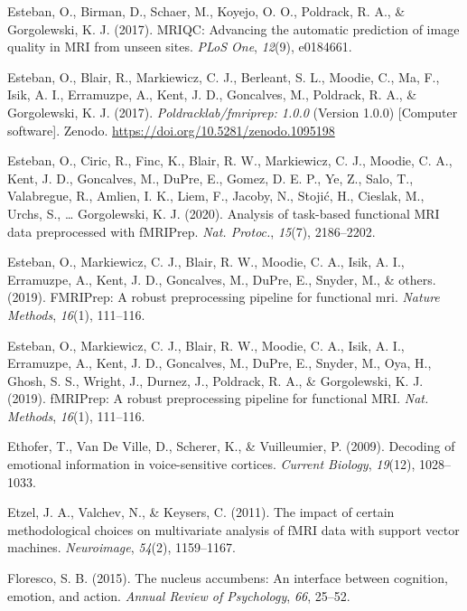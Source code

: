 \documentclass[11pt,american,a4paper,oneside,]{memoir} %
\begin{document}
\leavevmode\hypertarget{ref-Esteban2017-mv}{}%
Esteban, O., Birman, D., Schaer, M., Koyejo, O. O., Poldrack, R. A., \& Gorgolewski, K. J. (2017). MRIQC: Advancing the automatic prediction of image quality in MRI from unseen sites. \emph{PLoS One}, \emph{12}(9), e0184661.

\leavevmode\hypertarget{ref-esteban_oscar_2017_1095198}{}%
Esteban, O., Blair, R., Markiewicz, C. J., Berleant, S. L., Moodie, C., Ma, F., Isik, A. I., Erramuzpe, A., Kent, J. D., Goncalves, M., Poldrack, R. A., \& Gorgolewski, K. J. (2017). \emph{Poldracklab/fmriprep: 1.0.0} (Version 1.0.0) {[}Computer software{]}. Zenodo. \url{https://doi.org/10.5281/zenodo.1095198}

\leavevmode\hypertarget{ref-Esteban2020-qw}{}%
Esteban, O., Ciric, R., Finc, K., Blair, R. W., Markiewicz, C. J., Moodie, C. A., Kent, J. D., Goncalves, M., DuPre, E., Gomez, D. E. P., Ye, Z., Salo, T., Valabregue, R., Amlien, I. K., Liem, F., Jacoby, N., Stojić, H., Cieslak, M., Urchs, S., \ldots{} Gorgolewski, K. J. (2020). Analysis of task-based functional MRI data preprocessed with fMRIPrep. \emph{Nat. Protoc.}, \emph{15}(7), 2186--2202.

\leavevmode\hypertarget{ref-esteban2019fmriprep}{}%
Esteban, O., Markiewicz, C. J., Blair, R. W., Moodie, C. A., Isik, A. I., Erramuzpe, A., Kent, J. D., Goncalves, M., DuPre, E., Snyder, M., \& others. (2019). FMRIPrep: A robust preprocessing pipeline for functional mri. \emph{Nature Methods}, \emph{16}(1), 111--116.

\leavevmode\hypertarget{ref-Esteban2019-ri}{}%
Esteban, O., Markiewicz, C. J., Blair, R. W., Moodie, C. A., Isik, A. I., Erramuzpe, A., Kent, J. D., Goncalves, M., DuPre, E., Snyder, M., Oya, H., Ghosh, S. S., Wright, J., Durnez, J., Poldrack, R. A., \& Gorgolewski, K. J. (2019). fMRIPrep: A robust preprocessing pipeline for functional MRI. \emph{Nat. Methods}, \emph{16}(1), 111--116.

\leavevmode\hypertarget{ref-ethofer2009decoding}{}%
Ethofer, T., Van De Ville, D., Scherer, K., \& Vuilleumier, P. (2009). Decoding of emotional information in voice-sensitive cortices. \emph{Current Biology}, \emph{19}(12), 1028--1033.

\leavevmode\hypertarget{ref-etzel2011impact}{}%
Etzel, J. A., Valchev, N., \& Keysers, C. (2011). The impact of certain methodological choices on multivariate analysis of fMRI data with support vector machines. \emph{Neuroimage}, \emph{54}(2), 1159--1167.

\leavevmode\hypertarget{ref-floresco2015nucleus}{}%
Floresco, S. B. (2015). The nucleus accumbens: An interface between cognition, emotion, and action. \emph{Annual Review of Psychology}, \emph{66}, 25--52.
\end{document}
